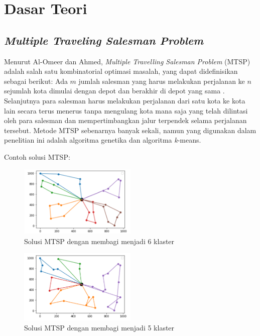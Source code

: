 
\section{Dasar Teori}

\subsection{\textit{Multiple Traveling Salesman Problem}}

Menurut Al-Omeer dan Ahmed, \textit{Multiple Travelling Salesman Problem} (MTSP) adalah salah satu kombinatorial optimasi masalah, yang dapat didefinisikan sebagai berikut: Ada $m$ jumlah salesman yang harus melakukan perjalanan ke $n$ sejumlah kota dimulai dengan depot dan berakhir di depot yang sama \cite{al2019comparative}. Selanjutnya para salesman harus melakukan perjalanan dari satu kota ke kota lain secara terus menerus tanpa mengulang kota mana saja yang telah dilintasi oleh para salesman dan mempertimbangkan jalur terpendek selama perjalanan tersebut. Metode MTSP sebenarnya banyak sekali, namun yang digunakan dalam penelitian ini adalah algoritma genetika dan algoritma \textit{k}-means.

Contoh solusi MTSP:

\begin{figure}[h!]
  \centering
  \includegraphics[width=0.5\textwidth]{Picture1.png}
  \caption{Solusi MTSP dengan membagi menjadi 6 klaster}
\end{figure}

\begin{figure}[h!]
  \centering
  \includegraphics[width=0.5\textwidth]{Picture2.png}
  \caption{Solusi MTSP dengan membagi menjadi 5 klaster}
\end{figure}

